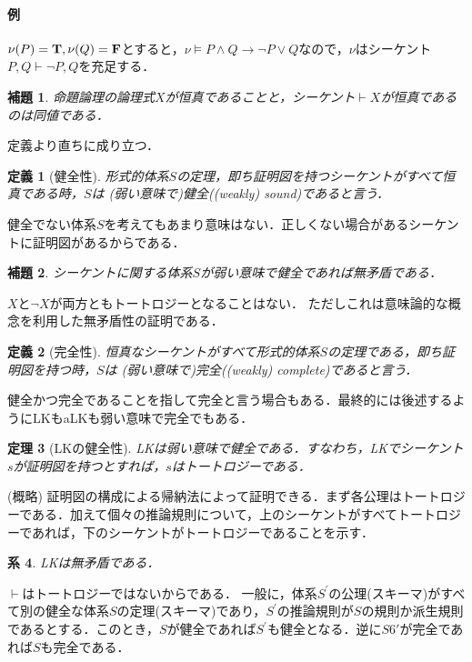 \documentclass{ltjsarticle}
\makeatletter
\theoremstyle{mystyle1}
\theoremstyle{mystyle3}
\newtheorem{cor}{系}
\newtheorem{lem}[cor]{補題}
\newtheorem{thm}[cor]{定理}
\theoremstyle{mystyle2}
\newtheorem{dfn*}{定義}
\renewenvironment{proof}[1][\proofname]{\par
  \pushQED{\qed}%
  \normalfont
  \topsep6\p@\@plus6\p@ \trivlist
  \item[\hskip\labelsep{\bfseries\sffamily #1}]\ignorespaces
}{%
  \popQED\endtrivlist\@endpefalse
}
\renewcommand\proofname{証明:}
\newcommand{\bT}{\ensuremath{\mathbf{T}}}
\newcommand{\bF}{\ensuremath{\mathbf{F}}}
\newcommand{\red}[1]{{\color{red} #1}}
\makeatother
\begin{document}
\paragraph{例}
$\nu\qty(P)=\bT, \nu\qty(Q)=\bF$とすると，$\nu\models P\wedge Q\to \neg P\vee Q$なので，$\nu$はシーケント$P,Q\vdash\neg P,Q$を充足する．
\begin{lem}
  命題論理の論理式$X$が恒真であることと，シーケント$\vdash X$が恒真であるのは同値である．
\end{lem}
\begin{proof}
  定義より直ちに成り立つ．
\end{proof}
\begin{dfn*}[健全性]
  形式的体系$S$の定理，即ち証明図を持つシーケントがすべて恒真である時，$S$は\red{(弱い意味で)健全}((weakly) sound)であると言う．
\end{dfn*}
健全でない体系$S$を考えてもあまり意味はない．正しくない場合があるシーケントに証明図があるからである．
\begin{lem}
  シーケントに関する体系$S$が弱い意味で健全であれば無矛盾である．
\end{lem}
\begin{proof}
  $X$と$\neg X$が両方ともトートロジーとなることはない．
\end{proof}
ただしこれは意味論的な概念を利用した無矛盾性の証明である．
\begin{dfn*}[完全性]
  恒真なシーケントがすべて形式的体系$S$の定理である，即ち証明図を持つ時，$S$は\red{(弱い意味で)完全}((weakly) complete)であると言う．
\end{dfn*}
健全かつ完全であることを指して完全と言う場合もある．最終的には後述するようにLKもaLKも弱い意味で完全でもある．
\begin{thm}[LKの健全性]
  LKは弱い意味で健全である．すなわち，LKでシーケント$s$が証明図を持つとすれば，$s$はトートロジーである．
\end{thm}
\begin{proof}
  (概略) 証明図の構成による帰納法によって証明できる．まず各公理はトートロジーである．加えて個々の推論規則について，上のシーケントがすべてトートロジーであれば，下のシーケントがトートロジーであることを示す．
\end{proof}
\begin{cor}
  LKは無矛盾である．
\end{cor}
\begin{proof}
  $\vdash$はトートロジーではないからである．
\end{proof}
一般に，体系$S^\prime$の公理(スキーマ)がすべて別の健全な体系$S$の定理(スキーマ)であり，$S^\prime$の推論規則が$S$の規則か派生規則であるとする．このとき，$S$が健全であれば$S^\prime$も健全となる．逆に$S6\prime$が完全であれば$S$も完全である．
\end{document}
